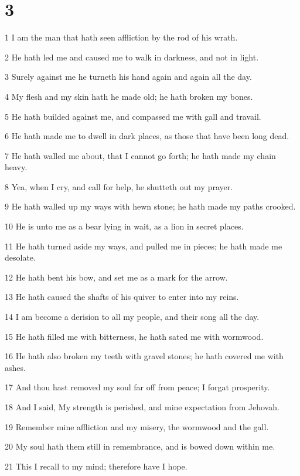 \chapter{3}

\par 1 I am the man that hath seen affliction by the rod of his wrath.
\par 2 He hath led me and caused me to walk in darkness, and not in light.
\par 3 Surely against me he turneth his hand again and again all the day.
\par 4 My flesh and my skin hath he made old; he hath broken my bones.
\par 5 He hath builded against me, and compassed me with gall and travail.
\par 6 He hath made me to dwell in dark places, as those that have been long dead.
\par 7 He hath walled me about, that I cannot go forth; he hath made my chain heavy.
\par 8 Yea, when I cry, and call for help, he shutteth out my prayer.
\par 9 He hath walled up my ways with hewn stone; he hath made my paths crooked.
\par 10 He is unto me as a bear lying in wait, as a lion in secret places.
\par 11 He hath turned aside my ways, and pulled me in pieces; he hath made me desolate.
\par 12 He hath bent his bow, and set me as a mark for the arrow.
\par 13 He hath caused the shafts of his quiver to enter into my reins.
\par 14 I am become a derision to all my people, and their song all the day.
\par 15 He hath filled me with bitterness, he hath sated me with wormwood.
\par 16 He hath also broken my teeth with gravel stones; he hath covered me with ashes.
\par 17 And thou hast removed my soul far off from peace; I forgat prosperity.
\par 18 And I said, My strength is perished, and mine expectation from Jehovah.
\par 19 Remember mine affliction and my misery, the wormwood and the gall.
\par 20 My soul hath them still in remembrance, and is bowed down within me.
\par 21 This I recall to my mind; therefore have I hope.
